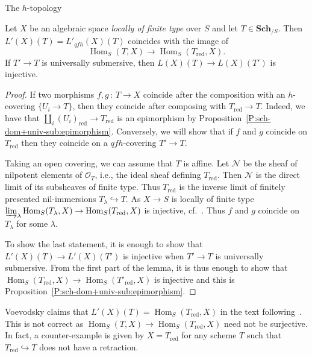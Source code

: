 \documentclass[a4paper,twoside,11pt]{amsart}[2009/07/02] %
\newcommand{\pref}[1]{\eqref{#1}}
\DeclareMathOperator{\Hom}{Hom}
\newcommand{\inj}{\hookrightarrow}
\newcommand{\map}[3]{#1\,:\, #2\rightarrow #3}
\newcommand{\Sch}{\mathbf{Sch}} %
\newcommand{\Spec}{\mathrm{Spec}}
\newcommand{\red}{\mathrm{red}}
\newcommand\sO{\mathcal{O}} %
\newcommand{\sN}{\mathcal{N}}
\begin{document}
\begin{section}{The $h$-topology}
\begin{lemma}\label{L:L'-desc}\label{L:epimorphic-nature-of-coverings}
Let $X$ be an algebraic space \emph{locally of finite type} over $S$ and let
$T\in\Sch_{/S}$.
%
Then $L'(X)(T)=L'_{qfh}(X)(T)$ coincides with the image of
%
$$\Hom_S(T,X)\to \Hom_S(T_\red,X).$$
%
If $T'\to T$ is universally submersive, then $L(X)(T)\to L(X)(T')$ is
injective.
\end{lemma}
\begin{proof}
If two morphisms $\map{f,g}{T}{X}$ coincide after the composition with an
$h$-covering $\{U_i\to T\}$, then they coincide after composing with
$T_\red\to T$. Indeed, we have that $\coprod_i (U_i)_\red\to T_\red$ is an
epimorphism by Proposition~\pref{P:sch-dom+univ-sub:epimorphism}.
%
Conversely, we will show that if $f$ and $g$ coincide on $T_\red$ then they
coincide on a $qfh$-covering $T'\to T$.

Taking an open covering, we can assume that $T$ is affine. Let $\sN$ be the
sheaf of nilpotent elements of $\sO_T$, i.e., the ideal sheaf defining
$T_\red$. Then $\sN$ is the direct limit of its subsheaves of finite type.
%
Thus $T_\red$ is the inverse limit of
finitely presented nil-immersions $T_\lambda\inj T$. As $X\to S$ is locally of
finite type $\varinjlim_\lambda \Hom_S(T_\lambda,X)\to
\Hom_S(T_\red,X)$ is injective, cf.~\cite[Thm.~8.8.2]{egaIV}. Thus $f$ and $g$
coincide on $T_\lambda$ for some $\lambda$.

To show the last statement, it is enough to show that $L'(X)(T)\to L'(X)(T')$
is injective when $T'\to T$ is universally submersive. From the first part
of the lemma, it is thus enough to show that $\Hom_S(T_\red,X)\to \Hom_S(T'_\red,X)$ is injective and this is Proposition~\pref{P:sch-dom+univ-sub:epimorphism}.\end{proof}

\begin{remark}
Voevodsky claims that $L'(X)(T)=\Hom_S(T_\red,X)$ in the text
following~\cite[Lem.~3.2.2]{voevodsky_homology}. This is not correct
as $\Hom_S(T,X)\to\Hom_S(T_\red,X)$ need not be surjective. In fact, a
counter-example is given by $X=T_\red$ for any scheme $T$ such that $T_\red\inj
T$ does not have a retraction.
\end{remark}


\end{section}
\end{document}
